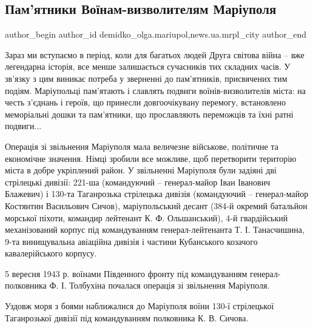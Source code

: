  
 
 
 
 
 
\subsection{Пам'ятники Воїнам-визволителям Маріуполя}
\label{sec:09_05_2018.stz.news.ua.mrpl_city.1.pamjatnyky_voinam_vyzvolyteljam_mariupolja}
 
\ifcmt
 author_begin
   author_id demidko_olga.mariupol,news.ua.mrpl_city
 author_end
\fi

Зараз ми вступаємо в період, коли для багатьох людей Друга світова війна – вже
легендарна історія, все менше залишається сучасників тих складних часів. У
зв'язку з цим виникає потреба у зверненні до пам'ятників, присвячених тим
подіям. Маріупольці пам'ятають і славлять подвиги воїнів-визволителів міста: на
честь з'єднань і героїв, що принесли довгоочікувану перемогу, встановлено
меморіальні дошки та пам'ятники, що прославляють переможців та їхні ратні
подвиги...

Операція зі звільнення Маріуполя мала величезне військове, політичне та
економічне значення. Німці зробили все можливе, щоб перетворити територію міста
в добре укріплений район. У звільненні Маріуполя були задіяні дві стрілецькі
дивізії: 221-ша (командуючий – генерал-майор Іван Іванович Блажевич) і 130-та
Таганрозька стрілецька дивізія (командуючий – генерал-майор Костянтин
Васильович Сичов), маріупольський десант (384-й окремий батальйон морської
піхоти, командир лейтенант К. Ф. Ольшанський), 4-й гвардійський механізований
корпус під командуванням генерал-лейтенанта Т. І. Танасчишина, 9-та винищувальна
авіаційна дивізія і частини Кубанського козачого кавалерійського корпусу.

5 вересня 1943 р. воїнами Південного фронту під командуванням
генерал-полковника Ф. І. Толбухіна почалася операція зі звільнення Маріуполя.

Уздовж моря з боями наближалися до Маріуполя воїни 130-ї стрілецької
Таганрозької дивізії під командуванням полковника К. В. Сичова.

